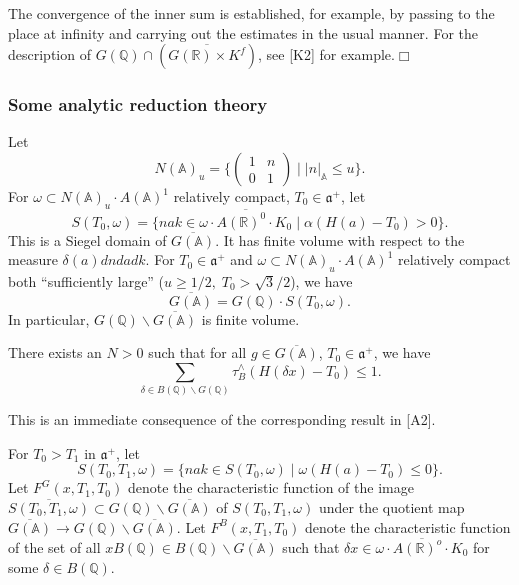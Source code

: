 The convergence of the inner sum is established, for example, by passing to
the place at infinity and carrying out the estimates in the usual manner.
For the description of
$G({\mathbb{Q}})\cap (\overline{G({\mathbb{R}})\times K^f})$,
see [K2] for example.$\Box $

\subsubsection{Some analytic reduction theory}

Let 
\[
N({\mathbb{A}})_u=\{\left( 
\begin{array}{cc}
1 & n \\ 
0 & 1
\end{array}
\right) \;|\;|n|_{{\mathbb{A}}}\leq u\}. 
\]
For $\omega \subset N({\mathbb{A}})_u\cdot A({\mathbb{A}})^1$
relatively compact, $T_0\in {\mathfrak{a}}^{+}$, let 
\[
S(T_0,\omega )=
\{nak\in \overline{\omega \cdot A({\mathbb{R}})^0\cdot K_0}
\;|\;\alpha (H(a)-T_0)>0\}. 
\]
This is a Siegel domain of $\overline{G({\mathbb{A}})}$. It has finite volume
with respect to the measure $\delta (a)dndadk$. For $T_0\in {\mathfrak{a}}^{+}$
and $\omega \subset N({\mathbb{A}})_u\cdot A({\mathbb{A}})^1$ relatively
compact both
``sufficiently large'' ($u\geq 1/2,\;T_0>\sqrt{3}/2$), we have 
\[
\overline{G({\mathbb{A}})}=G({\mathbb{Q}})\cdot S(T_0,\omega ). 
\]
In particular, $G({\mathbb{Q}})\backslash \overline{G({\mathbb{A}})}$ is
finite volume.

\begin{lemma}
There exists an $N>0$ such that for all $g\in \overline{G({\mathbb{A}})}$,
$T_0\in {\mathfrak{a}}^{+}$, we have 
\[
\sum_{\delta \in B({\mathbb{Q}})\backslash G({\mathbb{Q}})}
\tau _B^{\wedge }(H(\delta x)-T_0)\leq 1.
\]
\end{lemma}

This is an immediate consequence of the corresponding result in [A2].

For $T_0>T_1$ in ${\mathfrak{a}}^{+}$, let 
\[
S(T_0,T_1,\omega )=\{nak\in S(T_0,\omega )\;|\;\omega (H(a)-T_0)\leq 0\}. 
\]
Let $F^G(x,T_1,T_0)$ denote the characteristic function of the image
$\overline{S(T_0,T_1,\omega )}\subset
G({\mathbb{Q}})\backslash \overline{G({\mathbb{A}})}$ of
$S(T_0,T_1,\omega )$ under the quotient map
$\overline{G({\mathbb{A}})}\rightarrow
G({\mathbb{Q}})\backslash \overline{G({\mathbb{A}})}$. Let
$F^B(x,T_1,T_0)$
denote the characteristic function of the set of all
$xB({\mathbb{Q}})\in B({\mathbb{Q}})\backslash \overline{G({\mathbb{A}})}$ such
that $\delta x\in \overline{\omega \cdot A({\mathbb{R}})^o\cdot K_0}$
for some $\delta \in B({\mathbb{Q}})$.

